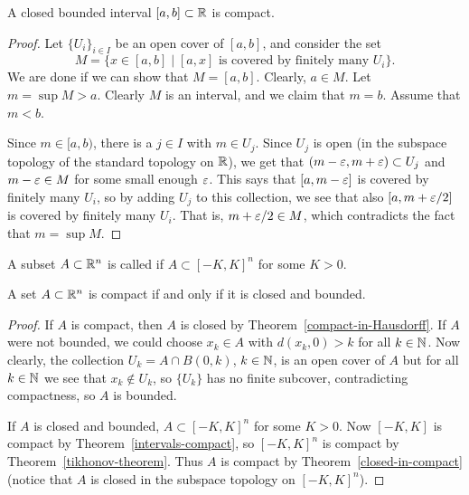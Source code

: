 \begin{thm}
  \label{intervals-compact}
  A closed bounded interval $[a,b] \subset \mathbb{R}$ is compact.
\end{thm}
\begin{proof}
  Let $\{U_i\}_{i\in I}$ be an open cover of $[a,b]$, and consider the set
  \[
    M = \{x \in [a,b] \mid \text{$[a,x]$ is covered by finitely many $U_i$}\}.
  \]
  We are done if we can show that $M = [a,b]$. Clearly, $a \in M$. Let $m = \sup M > a$. Clearly $M$ is an interval, and we claim that $m = b$. Assume that $m < b$.
  
  Since $m \in [a,b)$, there is a $j \in I$ with $m \in U_j$. Since $U_j$ is open (in the subspace topology of the standard topology on $\mathbb{R}$), we get that $(m-\varepsilon,m+\varepsilon) \subset U_j$ and $m - \varepsilon \in M$ for some small enough $\varepsilon$. This says that $[a,m-\varepsilon]$ is covered by finitely many $U_i$, so by adding $U_j$ to this collection, we see that also $[a,m+\varepsilon/2]$ is covered by finitely many $U_i$. That is, $m+\varepsilon/2 \in M$, which contradicts the fact that $m = \sup M$.  
\end{proof}
\begin{defn}
  A subset $A \subset \mathbb{R}^n$ is called  if $A \subset [-K,K]^n$ for some $K > 0$.
\end{defn}
\begin{thm}
  A set $A \subset \mathbb{R}^n$ is compact if and only if it is closed and bounded.
\end{thm}
\begin{proof}
  If $A$ is compact, then $A$ is closed by Theorem~\ref{compact-in-Hausdorff}. If $A$ were not bounded, we could choose $x_k \in A$ with $d(x_k,0) > k$ for all $k \in \mathbb{N}$. Now clearly, the collection $U_k = A \cap B(0,k)$, $k \in \mathbb{N}$, is an open cover of $A$ but for all $k \in \mathbb{N}$ we see that $x_k \notin U_k$, so $\{U_k\}$ has no finite subcover, contradicting compactness, so $A$ is bounded.
  
  If $A$ is closed and bounded, $A \subset [-K,K]^n$ for some $K > 0$. Now $[-K,K]$ is compact by Theorem~\ref{intervals-compact}, so $[-K,K]^n$ is compact by Theorem~\ref{tikhonov-theorem}. Thus $A$ is compact by Theorem~\ref{closed-in-compact} (notice that $A$ is closed in the subspace topology on $[-K,K]^n$).
\end{proof}
